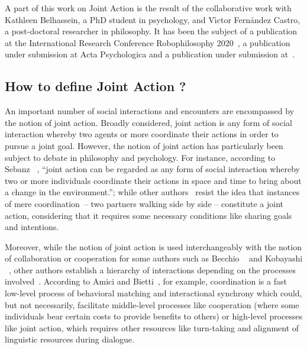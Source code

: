 \documentclass[a4paper,11pt,twoside]{StyleThese}
\begin{document}
A part of this work on Joint Action is the result of the collaborative work with Kathleen Belhassein, a PhD student in psychology, and V{\'\i}ctor Fern{\'a}ndez Castro, a post-doctoral researcher in philosophy. It has been the subject of a publication at the International Research Conference Robophilosophy 2020~\cite{belhassein_2020_horizontal}, a publication under submission at Acta Psychologica and a publication under submission at~.

\subsection{How to define Joint Action ?}

An important number of social interactions and encounters are encompassed by the notion of joint action. Broadly considered, joint action is any form of social interaction whereby two agents or more coordinate their actions in order to pursue a joint goal. However, the notion of joint action has particularly been subject to debate in philosophy and psychology. For instance, according to Sebanz \etal~\cite[p.~70]{sebanz_2006_joint}, ``joint action can be regarded as
any form of social interaction whereby two or more individuals coordinate their actions in space and time to bring about a change in the environment.''; while other authors~\cite{carpenter_2009_just, cohen_1991_teamwork, fiebich_2013_joint, tomasello_2005_understanding,pacherie_2012_agency} resist the idea that instances of mere coordination – \eg two partners walking side by side – constitute a joint action, considering that it requires some necessary conditions like sharing goals and intentions.

Moreover, while the notion of joint action is used interchangeably with the notion of collaboration or cooperation for some authors such as Becchio \etal~\cite{becchio_2010_toward} and Kobayashi \etal~\cite{kobayashi_2018_language}, other authors establish a hierarchy of interactions depending on the processes involved~\cite{amici_2015_coordination, chalmeau_1995_cooperation}. According to Amici and Bietti~\cite{amici_2015_coordination}, for example, coordination is a fast low-level process of behavioral matching and interactional synchrony which could, but not necessarily, facilitate middle-level processes like cooperation (where some individuals bear certain costs to provide benefits to others) or high-level processes like joint action, which requires other resources like turn-taking and alignment of linguistic resources during dialogue.
\end{document}
